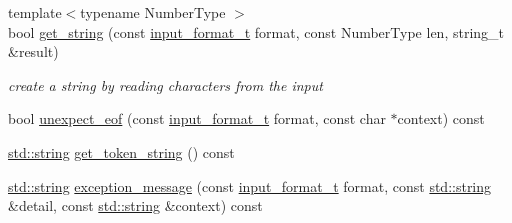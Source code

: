 \begin{DoxyCompactItemize}
\item 
{\footnotesize template$<$typename Number\+Type $>$ }\\bool \mbox{\hyperlink{classnlohmann_1_1detail_1_1binary__reader_a1f4b5da029a561c8711426b0a7316ec6}{get\+\_\+string}} (const \mbox{\hyperlink{namespacenlohmann_1_1detail_aa554fc6a11519e4f347deb25a9f0db40}{input\+\_\+format\+\_\+t}} format, const Number\+Type len, string\+\_\+t \&result)
\begin{DoxyCompactList}\small\item\em create a string by reading characters from the input \end{DoxyCompactList}\item 
bool \mbox{\hyperlink{classnlohmann_1_1detail_1_1binary__reader_a91dd7341d9d74c58866877ddfe58dd03}{unexpect\+\_\+eof}} (const \mbox{\hyperlink{namespacenlohmann_1_1detail_aa554fc6a11519e4f347deb25a9f0db40}{input\+\_\+format\+\_\+t}} format, const char $\ast$context) const
\item 
\mbox{\hyperlink{namespacenlohmann_1_1detail_a1ed8fc6239da25abcaf681d30ace4985ab45cffe084dd3d20d928bee85e7b0f21}{std\+::string}} \mbox{\hyperlink{classnlohmann_1_1detail_1_1binary__reader_acf8d3f7b17efd05655fcb6f47a2eaa79}{get\+\_\+token\+\_\+string}} () const
\item 
\mbox{\hyperlink{namespacenlohmann_1_1detail_a1ed8fc6239da25abcaf681d30ace4985ab45cffe084dd3d20d928bee85e7b0f21}{std\+::string}} \mbox{\hyperlink{classnlohmann_1_1detail_1_1binary__reader_a82b86133c98a0565446a44dfd3e418e6}{exception\+\_\+message}} (const \mbox{\hyperlink{namespacenlohmann_1_1detail_aa554fc6a11519e4f347deb25a9f0db40}{input\+\_\+format\+\_\+t}} format, const \mbox{\hyperlink{namespacenlohmann_1_1detail_a1ed8fc6239da25abcaf681d30ace4985ab45cffe084dd3d20d928bee85e7b0f21}{std\+::string}} \&detail, const \mbox{\hyperlink{namespacenlohmann_1_1detail_a1ed8fc6239da25abcaf681d30ace4985ab45cffe084dd3d20d928bee85e7b0f21}{std\+::string}} \&context) const
\end{DoxyCompactItemize}
